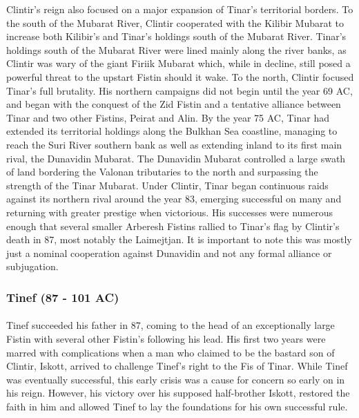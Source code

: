 					Clintir's reign also focused on a major expansion of Tinar's territorial borders. To the south of the Mubarat River, Clintir cooperated with the Kilibir Mubarat to increase both Kilibir's and Tinar's holdings south of the Mubarat River. Tinar's holdings south of the Mubarat River were lined mainly along the river banks, as Clintir was wary of the giant Firiik Mubarat which, while in decline, still posed a powerful threat to the upstart Fistin should it wake. To the north, Clintir focused Tinar's full brutality. His northern campaigns did not begin until the year 69 AC, and began with the conquest of the Zid Fistin and a tentative alliance between Tinar and two other Fistins, Peirat and Alin. By the year 75 AC, Tinar had extended its territorial holdings along the Bulkhan Sea coastline, managing to reach the Suri River southern bank as well as extending inland to its first main rival, the Dunavidin Mubarat. The Dunavidin Mubarat controlled a large swath of land bordering the Valonan tributaries to the north and surpassing the strength of the Tinar Mubarat. Under Clintir, Tinar began continuous raids against its northern rival around the year 83, emerging successful on many and returning with greater prestige when victorious. His successes were numerous enough that several smaller Arberesh Fistins rallied to Tinar's flag by Clintir's death in 87, most notably the Laimejtjan. It is important to note this was mostly just a nominal cooperation against Dunavidin and not any formal alliance or subjugation.
			\subsubsection{Tinef (87 - 101 AC)}
				\paragraph{}
					Tinef succeeded his father in 87, coming to the head of an exceptionally large Fistin with several other Fistin's following his lead. His first two years were marred with complications when a man who claimed to be the bastard son of Clintir, Iskott, arrived to challenge Tinef's right to the Fis of Tinar. While Tinef was eventually successful, this early crisis was a cause for concern so early on in his reign. However, his victory over his supposed half-brother Iskott, restored the faith in him and allowed Tinef to lay the foundations for his own successful rule.
					
